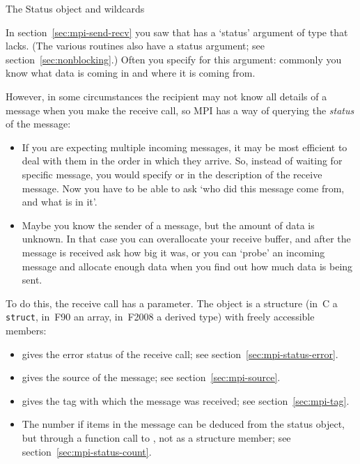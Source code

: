  {The Status object and wildcards}
\label{sec:mpi-wildcard}
\label{sec:mpi-status}

In section~\ref{sec:mpi-send-recv}
you saw that  has a `status' argument
of type  that  lacks.
(The various   routines also have a status
argument; see section~\ref{sec:nonblocking}.)
Often you specify 
for this argument: commonly you know
what data is coming in and where it is coming from.

However, in some circumstances the recipient may not know all details of a
message when you make the receive call, so MPI has a way of querying
the \emph{status} of the message:
\begin{itemize}
\item If you are expecting multiple incoming messages, it may be most
  efficient to deal with them in the order in which they arrive. So,
  instead of waiting for specific message, you would specify
   or  in
  the description of the receive message. 
  Now you have to be able to ask `who did this message come from,
  and what is in it'.
\item Maybe you know the sender of a message, but the amount of data
  is unknown. In that case you can overallocate your receive buffer,
  and after the message is received ask how big it was, or you can
  `probe' an incoming message and allocate enough data when you find
  out how much data is being sent.
\end{itemize}

To do this, the receive call has a  parameter.
The  object
is a structure (in~C a \lstinline{struct}, in~F90 an array, in~F2008 a derived type)
with freely accessible members:
\begin{itemize}
\item {} gives the error status of the receive call;
  see section~\ref{sec:mpi-status-error}.
\item {} gives the source of the message;
  see section~\ref{sec:mpi-source}.
\item {} gives the tag with which the message was received;
  see section~\ref{sec:mpi-tag}.
\item The number if items in the message can be deduced from the status object,
  but through a function call to ,
  not as a structure member;
  see section~\ref{sec:mpi-status-count}.
\end{itemize}

